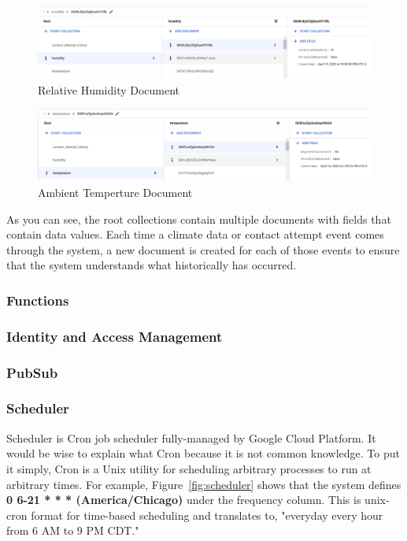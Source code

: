 \documentclass{article}
\begin{document}
\begin{figure}[H]
    \center
    \includegraphics[width=\textwidth]{images/database-humidity.png}
    \caption{Relative Humidity Document}
    \label{fig:humidity}
\end{figure}

\begin{figure}[H]
    \center
    \includegraphics[width=\textwidth]{images/database-temperature.png}
    \caption{Ambient Temperture Document}
    \label{fig:temperature}
\end{figure}

As you can see, the root collections contain multiple documents with fields that contain data values. Each time a climate data or contact attempt event comes through the system, a new document is created for each of those events to ensure that the system understands what historically has occurred.

\subsubsection{Functions}
\label{section:functions}

\subsubsection{Identity and Access Management}

\subsubsection{PubSub}

\subsubsection{Scheduler}
Scheduler is Cron job scheduler fully-managed by Google Cloud Platform. It would be wise to explain what Cron because it is not common knowledge. To put it simply, Cron is a Unix utility for scheduling arbitrary processes to run at arbitrary times. For example, Figure~\ref{fig:scheduler} shows that the system defines \textbf{0 6-21 * * * (America/Chicago)} under the frequency column. This is unix-cron format for time-based scheduling and translates to, "everyday every hour from 6 AM to 9 PM CDT."
\end{document}
